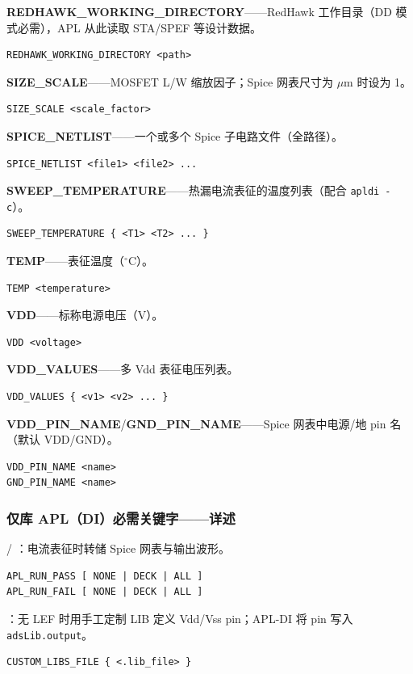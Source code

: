 \textbf{REDHAWK\_WORKING\_DIRECTORY}——RedHawk 工作目录（DD 模式必需），APL 从此读取 STA/SPEF 等设计数据。
\begin{lstlisting}
REDHAWK_WORKING_DIRECTORY <path>
\end{lstlisting}

\textbf{SIZE\_SCALE}——MOSFET L/W 缩放因子；Spice 网表尺寸为 $\mu$m 时设为 1。
\begin{lstlisting}
SIZE_SCALE <scale_factor>
\end{lstlisting}

\textbf{SPICE\_NETLIST}——一个或多个 Spice 子电路文件（全路径）。
\begin{lstlisting}
SPICE_NETLIST <file1> <file2> ...
\end{lstlisting}

\textbf{SWEEP\_TEMPERATURE}——热漏电流表征的温度列表（配合 \texttt{apldi -c}）。
\begin{lstlisting}
SWEEP_TEMPERATURE { <T1> <T2> ... }
\end{lstlisting}

\textbf{TEMP}——表征温度（$^\circ$C）。
\begin{lstlisting}
TEMP <temperature>
\end{lstlisting}

\textbf{VDD}——标称电源电压（V）。
\begin{lstlisting}
VDD <voltage>
\end{lstlisting}

\textbf{VDD\_VALUES}——多 Vdd 表征电压列表。
\begin{lstlisting}
VDD_VALUES { <v1> <v2> ... }
\end{lstlisting}

\textbf{VDD\_PIN\_NAME}/\textbf{GND\_PIN\_NAME}——Spice 网表中电源/地 pin 名（默认 VDD/GND）。
\begin{lstlisting}
VDD_PIN_NAME <name>
GND_PIN_NAME <name>
\end{lstlisting}
\subsubsection{仅库 APL（DI）必需关键字——详述}

 / ：电流表征时转储 Spice 网表与输出波形。
\begin{lstlisting}
APL_RUN_PASS [ NONE | DECK | ALL ]
APL_RUN_FAIL [ NONE | DECK | ALL ]
\end{lstlisting}

：无 LEF 时用手工定制 LIB 定义 Vdd/Vss pin；APL-DI 将 pin 写入 \texttt{adsLib.output}。
\begin{lstlisting}
CUSTOM_LIBS_FILE { <.lib_file> }
\end{lstlisting}

